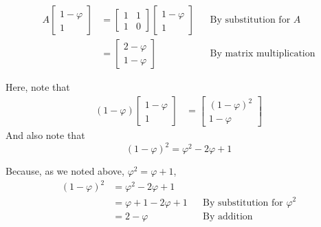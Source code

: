 \documentclass{article}
\newcommand{\reason}[1]{&& \text{#1}}
\begin{document}
\begin{enumerate}
        \begin{align*}
          A \begin{bmatrix}
              1-\varphi \\
              1
            \end{bmatrix} & = \begin{bmatrix}
                                1 & 1 \\
                                1 & 0
                              \end{bmatrix} \begin{bmatrix}
                                              1-\varphi \\
                                              1
                                            \end{bmatrix} \reason{By substitution for $A$} \\[1ex]
                              & = \begin{bmatrix}
                                    2-\varphi \\
                                    1-\varphi
                                  \end{bmatrix} \reason{By matrix multiplication}
        \end{align*}

        Here, note that
        \begin{align*}
          (1 - \varphi)\begin{bmatrix}
                         1 - \varphi \\
                         1
                       \end{bmatrix} & = \begin{bmatrix}
                                           (1 - \varphi)^2 \\
                                           1 - \varphi
                                         \end{bmatrix}
        \end{align*}
        And also note that
        \begin{equation}
          (1 - \varphi)^2 = \varphi^2 - 2\varphi + 1 \label{eq:1_minus_phi_vector_multiplication}
        \end{equation}

        Because, as we noted above, $\varphi^2 = \varphi + 1$,
        \begin{align*}
          (1 - \varphi)^2 & = \varphi^2 - 2\varphi + 1                                            \\
                          & = \varphi + 1 - 2\varphi + 1 \reason{By substitution for $\varphi^2$} \\
                          & = 2 - \varphi \reason{By addition}
        \end{align*}


\end{enumerate}
\end{document}
